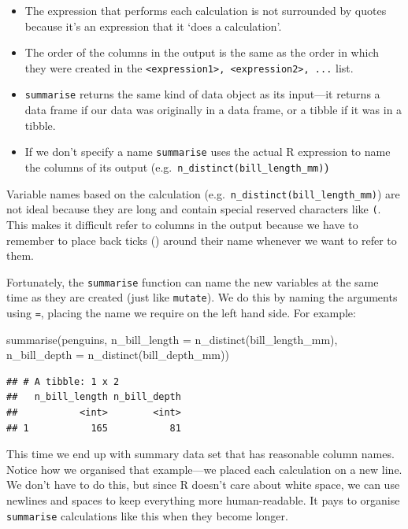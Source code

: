 \documentclass[
]{book}
\newenvironment{Shaded}{\begin{snugshade}}{\end{snugshade}}
\newcommand{\AttributeTok}[1]{\textcolor[rgb]{0.77,0.63,0.00}{#1}}
\newcommand{\FunctionTok}[1]{\textcolor[rgb]{0.00,0.00,0.00}{#1}}
\newcommand{\NormalTok}[1]{#1}
\providecommand{\tightlist}{%
  \setlength{\itemsep}{0pt}\setlength{\parskip}{0pt}}
\begin{document}
\begin{itemize}
\tightlist
\item
  The expression that performs each calculation is not surrounded by quotes because it's an expression that it `does a calculation'.
\item
  The order of the columns in the output is the same as the order in which they were created in the \texttt{\textless{}expression1\textgreater{},\ \textless{}expression2\textgreater{},\ ...} list.
\item
  \texttt{summarise} returns the same kind of data object as its input---it returns a data frame if our data was originally in a data frame, or a tibble if it was in a tibble.
\item
  If we don't specify a name \texttt{summarise} uses the actual R expression to name the columns of its output (e.g.~\texttt{n\_distinct(bill\_length\_mm)}\textbf{)}
\end{itemize}

Variable names based on the calculation (e.g.~\texttt{n\_distinct(bill\_length\_mm)}) are not ideal because they are long and contain special reserved characters like \texttt{(}. This makes it difficult refer to columns in the output because we have to remember to place back ticks (\texttt{\textasciigrave{}}) around their name whenever we want to refer to them.

Fortunately, the \texttt{summarise} function can name the new variables at the same time as they are created (just like \texttt{mutate}). We do this by naming the arguments using \texttt{=}, placing the name we require on the left hand side. For example:

\begin{Shaded}
\begin{Highlighting}[]
\FunctionTok{summarise}\NormalTok{(penguins, }
          \AttributeTok{n\_bill\_length =} \FunctionTok{n\_distinct}\NormalTok{(bill\_length\_mm), }
          \AttributeTok{n\_bill\_depth  =} \FunctionTok{n\_distinct}\NormalTok{(bill\_depth\_mm))}
\end{Highlighting}
\end{Shaded}

\begin{verbatim}
## # A tibble: 1 x 2
##   n_bill_length n_bill_depth
##           <int>        <int>
## 1           165           81
\end{verbatim}

This time we end up with summary data set that has reasonable column names. Notice how we organised that example---we placed each calculation on a new line. We don't have to do this, but since R doesn't care about white space, we can use newlines and spaces to keep everything more human-readable. It pays to organise \texttt{summarise} calculations like this when they become longer.
\end{document}
